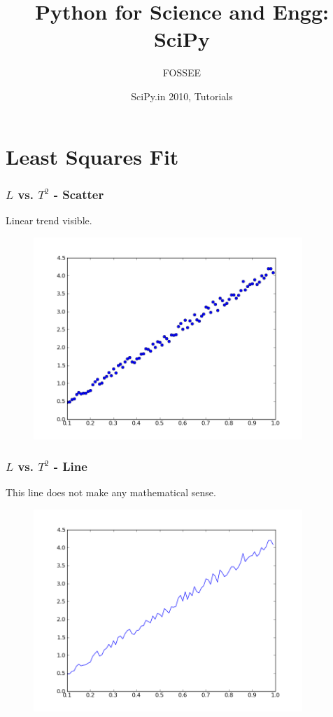 \documentclass[14pt,compress]{beamer}
\title[Solving Equations \& ODEs]{Python for Science and Engg:\\SciPy}
\author[FOSSEE] {FOSSEE}
\institute[IIT Bombay] {Department of Aerospace Engineering\\IIT Bombay}
\date[] {SciPy.in 2010, Tutorials}
\begin{document}
\begin{frame}
  \maketitle
\end{frame}


\section{Least Squares Fit}
\begin{frame}[fragile]
\frametitle{$L$ vs. $T^2$ - Scatter}
Linear trend visible.
\vspace{-0.1in}
\begin{figure}
\includegraphics[width=4in]{data/L-Tsq-points}
\end{figure}
\end{frame}

\begin{frame}[fragile]
\frametitle{$L$ vs. $T^2$ - Line}
This line does not make any mathematical sense.
\vspace{-0.1in}
\begin{figure}
\includegraphics[width=4in]{data/L-Tsq-Line}
\end{figure}
\end{frame}
\end{document}

